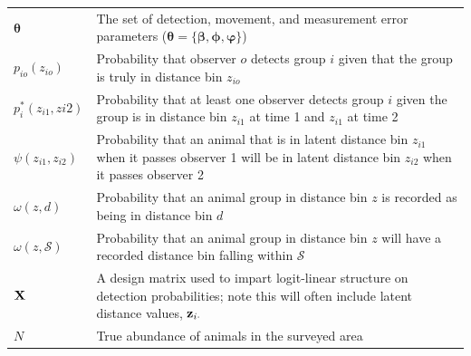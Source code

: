 \documentclass[12pt,fleqn]{article}
\begin{document}
\begin{table}[ht]
\begin{tabular}{p{2cm}p{13cm}}
  $\boldsymbol{\theta}$ & The set of detection, movement, and measurement error parameters ($\boldsymbol{\theta} = \{ \boldsymbol{\beta},\boldsymbol{\phi},\boldsymbol{\varphi} \}$) \\
  $p_{io}(z_{io})$ & Probability that observer $o$ detects group $i$ given that the group is truly in distance bin $z_{io}$\\
  $p_i^*(z_{i1},z{i2})$ & Probability that at least one observer detects group $i$ given the group is in distance bin $z_{i1}$ at time 1 and $z_{i1}$ at time 2\\
  $\psi(z_{i1},z_{i2})$ & Probability that an animal that is in latent distance bin $z_{i1}$ when it passes observer 1 will be in latent distance bin $z_{i2}$ when it passes observer 2 \\
  $\omega(z,d)$ & Probability that an animal group in distance bin $z$ is recorded as being in distance bin $d$ \\
  $\omega(z,\mathcal{S})$ & Probability that an animal group in distance bin $z$ will have a recorded distance bin falling within $\mathcal{S}$ \\
  ${\bf X}$ & A design matrix used to impart logit-linear structure on detection probabilities; note this will often include latent distance values, ${\bf z}_{i \cdot}$  \\
  $N$ & True abundance of animals in the surveyed area \\
\hline
\end{tabular}
\\
\end{table}
\end{document}
